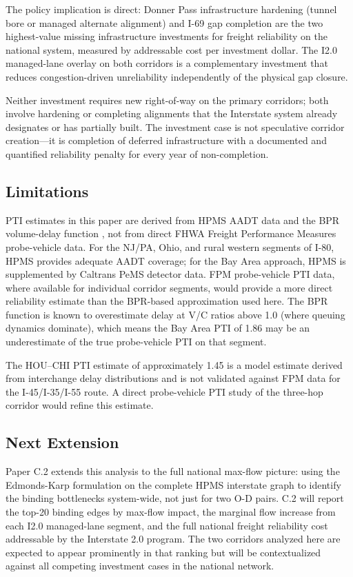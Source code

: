 The policy implication is direct: Donner Pass infrastructure hardening (tunnel bore or managed alternate alignment) and I-69 gap completion are the two highest-value missing infrastructure investments for freight reliability on the national system, measured by addressable cost per investment dollar. The I2.0 managed-lane overlay on both corridors is a complementary investment that reduces congestion-driven unreliability independently of the physical gap closure.

Neither investment requires new right-of-way on the primary corridors; both involve hardening or completing alignments that the Interstate system already designates or has partially built. The investment case is not speculative corridor creation---it is completion of deferred infrastructure with a documented and quantified reliability penalty for every year of non-completion.

\subsection{Limitations}

PTI estimates in this paper are derived from HPMS AADT data and the BPR volume-delay function \citep{HCM7}, not from direct FHWA Freight Performance Measures probe-vehicle data. For the NJ/PA, Ohio, and rural western segments of I-80, HPMS provides adequate AADT coverage; for the Bay Area approach, HPMS is supplemented by Caltrans PeMS detector data. FPM probe-vehicle PTI data, where available for individual corridor segments, would provide a more direct reliability estimate than the BPR-based approximation used here. The BPR function is known to overestimate delay at V/C ratios above 1.0 (where queuing dynamics dominate), which means the Bay Area PTI of 1.86 may be an underestimate of the true probe-vehicle PTI on that segment.

The HOU--CHI PTI estimate of approximately 1.45 is a model estimate derived from interchange delay distributions and is not validated against FPM data for the I-45/I-35/I-55 route. A direct probe-vehicle PTI study of the three-hop corridor would refine this estimate.

\subsection{Next Extension}

Paper C.2 extends this analysis to the full national max-flow picture: using the Edmonds-Karp formulation on the complete HPMS interstate graph to identify the binding bottlenecks system-wide, not just for two O-D pairs. C.2 will report the top-20 binding edges by max-flow impact, the marginal flow increase from each I2.0 managed-lane segment, and the full national freight reliability cost addressable by the Interstate 2.0 program. The two corridors analyzed here are expected to appear prominently in that ranking but will be contextualized against all competing investment cases in the national network.
